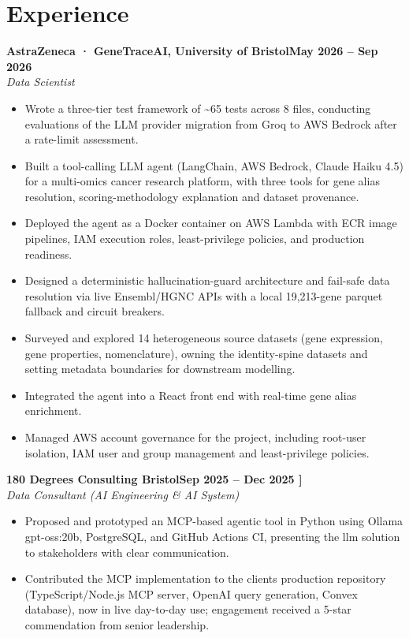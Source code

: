 \documentclass[a4paper,11pt]{article}
\newcommand{\entry}[4]{\needspace{4\baselineskip}\noindent\textbf{#1}\hfill\textbf{#2}\\ \textit{#3}\hfill\textit{#4}\par}
\begin{document}
\section{Experience}
\entry{AstraZeneca · GeneTraceAI, University of Bristol}{May 2026 – Sep 2026}{Data Scientist}{}
\begin{itemize}
  \item Wrote a three-tier test framework of \textasciitilde{}65 tests across 8 files, conducting evaluations of the LLM provider migration from Groq to AWS Bedrock after a rate-limit assessment.
  \item Built a tool-calling LLM agent (LangChain, AWS Bedrock, Claude Haiku 4.5) for a multi-omics cancer research platform, with three tools for gene alias resolution, scoring-methodology explanation and dataset provenance.
  \item Deployed the agent as a Docker container on AWS Lambda with ECR image pipelines, IAM execution roles, least-privilege policies, and production readiness.
  \item Designed a deterministic hallucination-guard architecture and fail-safe data resolution via live Ensembl/HGNC APIs with a local 19,213-gene parquet fallback and circuit breakers.
  \item Surveyed and explored 14 heterogeneous source datasets (gene expression, gene properties, nomenclature), owning the identity-spine datasets and setting metadata boundaries for downstream modelling.
  \item Integrated the agent into a React front end with real-time gene alias enrichment.
  \item Managed AWS account governance for the project, including root-user isolation, IAM user and group management and least-privilege policies.
\end{itemize}
\vspace{4pt}
\entry{180 Degrees Consulting Bristol}{Sep 2025 – Dec 2025   ]}{Data Consultant (AI Engineering \& AI System)}{}
\begin{itemize}
  \item Proposed and prototyped an MCP-based agentic tool in Python using Ollama gpt-oss:20b, PostgreSQL, and GitHub Actions CI, presenting the llm solution to stakeholders with clear communication.
  \item Contributed the MCP implementation to the client\textquotesingle{}s production repository (TypeScript/Node.js MCP server, OpenAI query generation, Convex database), now in live day-to-day use; engagement received a 5-star commendation from senior leadership.
\end{itemize}
\end{document}
